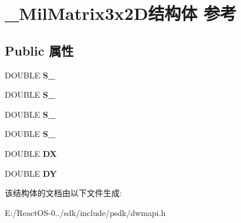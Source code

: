 \hypertarget{struct___mil_matrix3x2_d}{}\section{\+\_\+\+Mil\+Matrix3x2\+D结构体 参考}
\label{struct___mil_matrix3x2_d}
\subsection*{Public 属性}
\begin{DoxyCompactItemize}
\item 
\mbox{\label{struct___mil_matrix3x2_d_a37e6e51bdc6735c25d1345941df6bb31}} 
D\+O\+U\+B\+LE {\bfseries S\+\_}
\item 
\mbox{\label{struct___mil_matrix3x2_d_a8ed00fc6c95a5838b564d74bf110f409}} 
D\+O\+U\+B\+LE {\bfseries S\+\_}
\item 
\mbox{\label{struct___mil_matrix3x2_d_a644e429ac9b8b0e8e0ecc3251e1c5b03}} 
D\+O\+U\+B\+LE {\bfseries S\+\_}
\item 
\mbox{\label{struct___mil_matrix3x2_d_a70d8ef43d8532917e6dce2c2d873fb45}} 
D\+O\+U\+B\+LE {\bfseries S\+\_}
\item 
\mbox{\label{struct___mil_matrix3x2_d_aa68ca1cc393f16a8c89401d5075b599a}} 
D\+O\+U\+B\+LE {\bfseries DX}
\item 
\mbox{\label{struct___mil_matrix3x2_d_a0e32c9a4a4d4c9fda021771203dadb07}} 
D\+O\+U\+B\+LE {\bfseries DY}
\end{DoxyCompactItemize}


该结构体的文档由以下文件生成\+:\begin{DoxyCompactItemize}
\item 
E\+:/\+React\+O\+S-\/0../sdk/include/psdk/dwmapi.\+h\end{DoxyCompactItemize}
